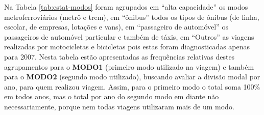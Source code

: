 Na Tabela \ref{tab:estat-modos} foram agrupados em ``alta capacidade'' os modos metroferroviários (metrô e trem), em ``ônibus'' todos os tipos de ônibus (de linha, escolar, de empresas, lotações e vans), em ``passageiro de automóvel'' os passageiros de automóvel particular e também de táxis, em ``Outros'' as viagens realizadas por motocicletas e bicicletas pois estas foram diagnosticadas apenas para 2007. Nesta tabela estão apresentadas as frequências relativas destes agrupamentos para o \textbf{MODO1} (primeiro modo utilizado na viagem) e também para o \textbf{MODO2} (segundo modo utilizado), buscando avaliar a divisão modal por ano, para quem realizou viagem. Assim, para o primeiro modo o total soma 100\% em todos anos, mas o total por ano do segundo modo em diante não necessariamente, porque nem todas viagens utilizaram mais de um modo.


